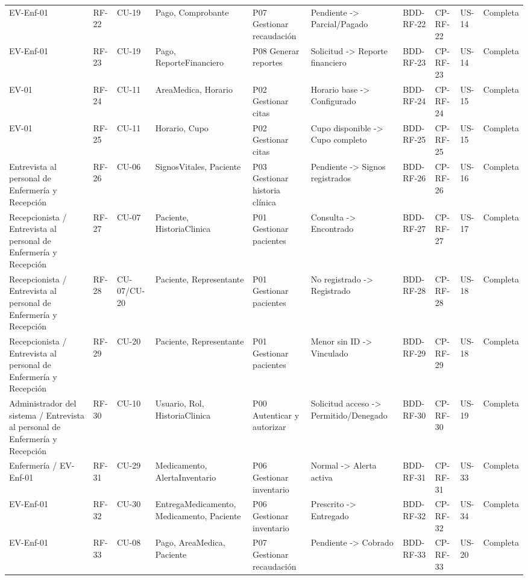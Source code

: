 \documentclass[11pt,a4paper]{article}
\begin{document}
\begin{appendices}
\begin{landscape}
\begin{longtable}{p{2.2cm}p{1.8cm}p{2cm}p{3cm}p{3cm}p{3cm}p{2cm}p{2cm}p{2cm}p{1.6cm}}
				EV-Enf-01 & RF-22 & CU-19 & Pago, Comprobante & P07 Gestionar recaudación & Pendiente -> Parcial/Pagado & BDD-RF-22 & CP-RF-22 & US-14 & Completa\\
				EV-Enf-01 & RF-23 & CU-19 & Pago, ReporteFinanciero & P08 Generar reportes & Solicitud -> Reporte financiero & BDD-RF-23 & CP-RF-23 & US-14 & Completa\\
				EV-01 & RF-24 & CU-11 & AreaMedica, Horario & P02 Gestionar citas & Horario base -> Configurado & BDD-RF-24 & CP-RF-24 & US-15 & Completa\\
				EV-01 & RF-25 & CU-11 & Horario, Cupo & P02 Gestionar citas & Cupo disponible -> Cupo completo & BDD-RF-25 & CP-RF-25 & US-15 & Completa\\
				Entrevista al personal de Enfermería y Recepción & RF-26 & CU-06 & SignosVitales, Paciente & P03 Gestionar historia clínica & Pendiente -> Signos registrados & BDD-RF-26 & CP-RF-26 & US-16 & Completa\\
				Recepcionista / Entrevista al personal de Enfermería y Recepción & RF-27 & CU-07 & Paciente, HistoriaClinica & P01 Gestionar pacientes & Consulta -> Encontrado & BDD-RF-27 & CP-RF-27 & US-17 & Completa\\
				Recepcionista / Entrevista al personal de Enfermería y Recepción & RF-28 & CU-07/CU-20 & Paciente, Representante & P01 Gestionar pacientes & No registrado -> Registrado & BDD-RF-28 & CP-RF-28 & US-18 & Completa\\
				Recepcionista / Entrevista al personal de Enfermería y Recepción & RF-29 & CU-20 & Paciente, Representante & P01 Gestionar pacientes & Menor sin ID -> Vinculado & BDD-RF-29 & CP-RF-29 & US-18 & Completa\\
				Administrador del sistema / Entrevista al personal de Enfermería y Recepción & RF-30 & CU-10 & Usuario, Rol, HistoriaClinica & P00 Autenticar y autorizar & Solicitud acceso -> Permitido/Denegado & BDD-RF-30 & CP-RF-30 & US-19 & Completa\\
				Enfermería / EV-Enf-01 & RF-31 & CU-29 & Medicamento, AlertaInventario & P06 Gestionar inventario & Normal -> Alerta activa & BDD-RF-31 & CP-RF-31 & US-33 & Completa\\
				EV-Enf-01 & RF-32 & CU-30 & EntregaMedicamento, Medicamento, Paciente & P06 Gestionar inventario & Prescrito -> Entregado & BDD-RF-32 & CP-RF-32 & US-34 & Completa\\
				EV-Enf-01 & RF-33 & CU-08 & Pago, AreaMedica, Paciente & P07 Gestionar recaudación & Pendiente -> Cobrado & BDD-RF-33 & CP-RF-33 & US-20 & Completa\\

\end{longtable}
\end{landscape}
\end{appendices}
\end{document}
